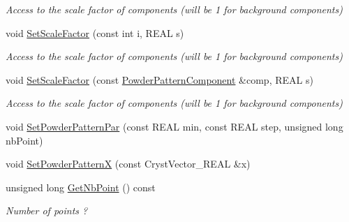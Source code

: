 \begin{DoxyCompactItemize}
\begin{DoxyCompactList}\small\item\em Access to the scale factor of components (will be 1 for background components) \end{DoxyCompactList}\item 
\mbox{\label{class_obj_cryst_1_1_powder_pattern_a62f0bbe83a48154e23e8698e86545bb2}} 
void \mbox{\hyperlink{class_obj_cryst_1_1_powder_pattern_a62f0bbe83a48154e23e8698e86545bb2}{Set\+Scale\+Factor}} (const int i, R\+E\+AL s)
\begin{DoxyCompactList}\small\item\em Access to the scale factor of components (will be 1 for background components) \end{DoxyCompactList}\item 
\mbox{\label{class_obj_cryst_1_1_powder_pattern_a23c3b15a62b104c8d3d5253d9975467f}} 
void \mbox{\hyperlink{class_obj_cryst_1_1_powder_pattern_a23c3b15a62b104c8d3d5253d9975467f}{Set\+Scale\+Factor}} (const \mbox{\hyperlink{class_obj_cryst_1_1_powder_pattern_component}{Powder\+Pattern\+Component}} \&comp, R\+E\+AL s)
\begin{DoxyCompactList}\small\item\em Access to the scale factor of components (will be 1 for background components) \end{DoxyCompactList}\item 
void \mbox{\hyperlink{class_obj_cryst_1_1_powder_pattern_adb92497ec0c6793c1cb74fc1bf9914e2}{Set\+Powder\+Pattern\+Par}} (const R\+E\+AL min, const R\+E\+AL step, unsigned long nb\+Point)
\item 
void \mbox{\hyperlink{class_obj_cryst_1_1_powder_pattern_a64170b8ead948e9b8569e1613d849583}{Set\+Powder\+PatternX}} (const Cryst\+Vector\+\_\+\+R\+E\+AL \&x)
\item 
\mbox{\label{class_obj_cryst_1_1_powder_pattern_a6bd7666d4c7aedfadc59bc567474540e}} 
unsigned long \mbox{\hyperlink{class_obj_cryst_1_1_powder_pattern_a6bd7666d4c7aedfadc59bc567474540e}{Get\+Nb\+Point}} () const
\begin{DoxyCompactList}\small\item\em Number of points ? \end{DoxyCompactList}\item 
\mbox{\label{class_obj_cryst_1_1_powder_pattern_a9267c87c1e23978733d709827a6d6fc3}} 

\end{DoxyCompactItemize}

